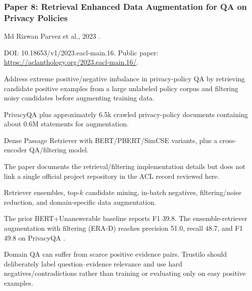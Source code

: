 \documentclass[11pt,journal,onecolumn]{IEEEtran}
\begin{document}
\subsubsection{Paper 8: Retrieval Enhanced Data Augmentation for QA on Privacy Policies}
\begin{description}[leftmargin=3.25cm,style=nextline]
\item[Authors / Year] Md Rizwan Parvez et al., 2023 \cite{parvez2023privacyqa}.
\item[DOI / Link] DOI: 10.18653/v1/2023.eacl-main.16. Public paper: \url{https://aclanthology.org/2023.eacl-main.16/}.
\item[Main idea] Address extreme positive/negative imbalance in privacy-policy QA by retrieving candidate positive examples from a large unlabeled policy corpus and filtering noisy candidates before augmenting training data.
\item[Datasets] PrivacyQA plus approximately 6.5k crawled privacy-policy documents containing about 0.6M statements for augmentation.
\item[Models] Dense Passage Retriever with BERT/PBERT/SimCSE variants, plus a cross-encoder QA/filtering model.
\item[Code] The paper documents the retrieval/filtering implementation details but does not link a single official project repository in the ACL record reviewed here.
\item[Procedure / tricks] Retriever ensembles, top-$k$ candidate mining, in-batch negatives, filtering/noise reduction, and domain-specific data augmentation.
\item[Metrics / results] The prior BERT+Unanswerable baseline reports F1 39.8. The ensemble-retriever augmentation with filtering (ERA-D) reaches precision 51.0, recall 48.7, and F1 49.8 on PrivacyQA \cite{parvez2023privacyqa}.
\item[Key learning] Domain QA can suffer from scarce positive evidence pairs. Trustilo should deliberately label question--evidence relevance and use hard negatives/contradictions rather than training or evaluating only on easy positive examples.
\end{description}
\end{document}
